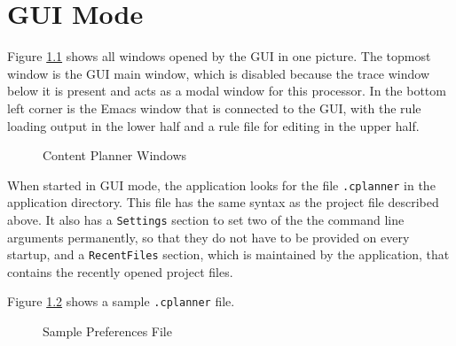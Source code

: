 \documentclass[11pt,a4paper]{report}
\begin{document}

\chapter{GUI Mode}

Figure \ref{fig:allguiwindows} shows all windows opened by the GUI in one
picture. The topmost window is the GUI main window, which is disabled because
the trace window below it is present and acts as a modal window for this
processor. In the bottom left corner is the Emacs window that is connected
to the GUI, with the rule loading output in the lower half and a rule file
for editing in the upper half.

\begin{figure}[htbp]
  \centering
  \caption{Content Planner Windows}
  \label{fig:allguiwindows}
\end{figure}

When started in GUI mode, the application looks for the file \texttt{.cplanner}
in the application directory. This file has the same syntax as the project
file described above. It also has a \texttt{Settings} section to set two of the
the command line arguments permanently, so that they do not have to be provided
on every startup, and a \texttt{RecentFiles} section, which is maintained by
the application, that contains the recently opened project files.

Figure \ref{fig:preferencesfile} shows a sample \texttt{.cplanner} file.

\begin{figure}[htbp]
  \centering
  \centering{}

  \caption{Sample Preferences File}
  \label{fig:preferencesfile}
\end{figure}
\end{document}
